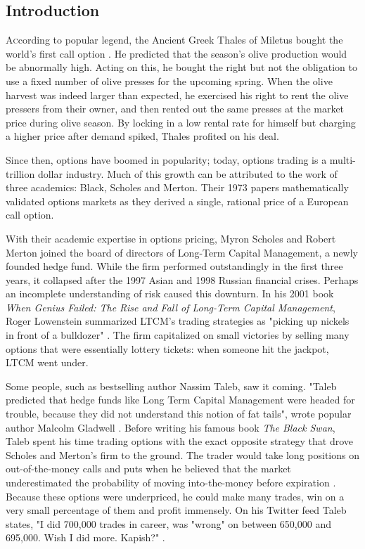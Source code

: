 \documentclass[twoside]{article}
\begin{document}
\begin{multicols}{2} %

\section{Introduction}

\lettrine[nindent=0em,lines=3]{A} ccording to popular legend, the Ancient Greek Thales of Miletus bought the world's first call option \cite{tibben2006real}. He predicted that the season's olive production would be abnormally high. Acting on this, he bought the right but not the obligation to use a fixed number of olive presses for the upcoming spring. When the olive harvest was indeed larger than expected, he exercised his right to rent the olive pressers from their owner, and then rented out the same presses at the market price during olive season. By locking in a low rental rate for himself but charging a higher price after demand spiked, Thales profited on his deal.

Since then, options have boomed in popularity; today, options trading is a multi-trillion dollar industry. Much of this growth can be attributed to the work of three academics: Black, Scholes and Merton. Their 1973 papers mathematically validated options markets as they derived a single, rational price of a European call option.

With their academic expertise in options pricing, Myron Scholes and Robert Merton joined the board of directors of Long-Term Capital Management, a newly founded hedge fund. While the firm performed outstandingly in the first three years, it collapsed after the 1997 Asian and 1998 Russian financial crises. Perhaps an incomplete understanding of risk caused this downturn. In his 2001 book \emph{When Genius Failed: The Rise and Fall of Long-Term Capital Management}, Roger Lowenstein summarized LTCM's trading strategies as "picking up nickels in front of a bulldozer" \cite{lowenstein2001genius}. The firm capitalized on small victories by selling many options that were essentially lottery tickets: when someone hit the jackpot, LTCM went under.

Some people, such as bestselling author Nassim Taleb, saw it coming. "Taleb predicted that hedge funds like Long Term Capital Management were headed for trouble, because they did not understand this notion of fat tails", wrote popular author Malcolm Gladwell \cite{gladwell}. Before writing his famous book \emph{The Black Swan}, Taleb spent his time trading options with the exact opposite strategy that drove Scholes and Merton's firm to the ground. The trader would take long positions on out-of-the-money calls and puts when he believed that the market underestimated the probability of moving into-the-money before expiration \cite{gladwell}. Because these options were underpriced, he could make many trades, win on a very small percentage of them and profit immensely. On his Twitter feed Taleb states, "I did 700,000 trades in career, was "wrong" on between 650,000 and 695,000. Wish I did more. Kapish?" \cite{twitter}.


\end{multicols}
\end{document}
